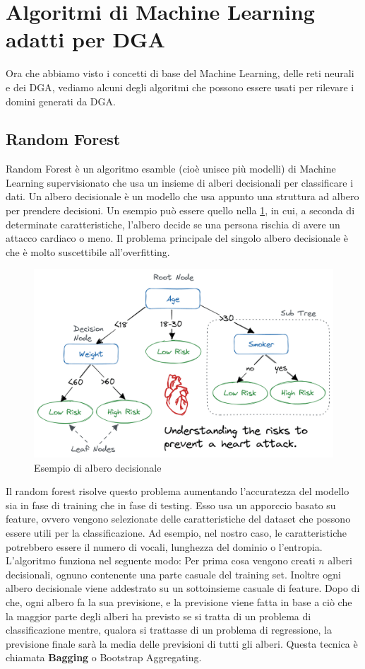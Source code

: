 \documentclass[12pt,a4paper,openright,twoside]{book}
\begin{document}
\section{Algoritmi di Machine Learning adatti per DGA}

Ora che abbiamo visto i concetti di base del Machine Learning, delle reti neurali
e dei \acrshort{DGA}, vediamo alcuni degli algoritmi che possono essere usati
per rilevare i domini generati da \acrshort{DGA}.

\subsection{Random Forest}

Random Forest è un algoritmo esamble (cioè unisce più modelli) di Machine Learning supervisionato
che usa un insieme di alberi decisionali
per classificare i dati. Un albero decisionale è un modello che usa appunto una struttura ad albero
per prendere decisioni. Un esempio può essere quello nella \cref{fig:decision tree}, in cui, a seconda di determinate
caratteristiche, l'albero decide se una persona rischia di avere un attacco cardiaco o meno.
Il problema principale del singolo albero decisionale è che è molto suscettibile
all'overfitting.
\begin{figure}[H]
    \centering
    \includegraphics[width=.8\linewidth]{figures/Decision_tree_for_heart_attack.png}
    \caption{Esempio di albero decisionale \cite{decision_tree_image}}
    \label{fig:decision tree}
\end{figure}

\noindent Il random forest risolve questo problema aumentando 
l'accuratezza del modello sia in fase di training che in fase di testing. \cite{598994}
Esso usa un apporccio basato su feature, ovvero vengono selezionate
delle caratteristiche del dataset che possono essere utili per la classificazione.
Ad esempio, nel nostro caso, le caratteristiche potrebbero essere
il numero di vocali, lunghezza del dominio o l'entropia.
L'algoritmo funziona nel seguente modo:
Per prima cosa vengono creati $n$ alberi decisionali, ognuno
contenente una parte casuale del training set. Inoltre
ogni albero decisionale viene addestrato su un sottoinsieme casuale
di feature. Dopo di che, ogni albero fa la sua previsione,
e la previsione viene fatta in base a ciò che la maggior parte
degli alberi ha previsto se si tratta di un problema di classificazione mentre, qualora si trattasse di un problema di regressione,
la previsione finale sarà la media delle previsioni di tutti gli alberi.
Questa tecnica è chiamata \textbf{Bagging} o Bootstrap Aggregating.
\end{document}
